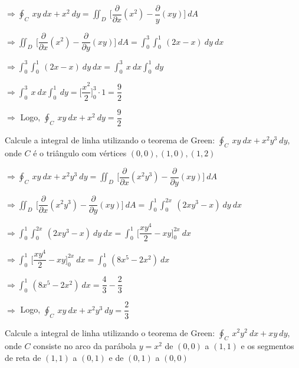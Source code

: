 \documentclass[11pt,a4paper]{article}
\begin{document}
\begin{enumerate}
{		$\Rightarrow \displaystyle\oint_C\ xy\ dx + x^2\ dy = \displaystyle\iint_D\ \Bigg[\dfrac{\partial}{\partial x}(x^2) - \dfrac{\partial}{y}(xy)\Bigg]\ dA$
		
		$\Rightarrow \displaystyle\iint_D\ \Bigg[\dfrac{\partial}{\partial x}(x^2) - \dfrac{\partial}{\partial y}(xy)\Bigg]\ dA = \displaystyle\int_{0}^{3}\displaystyle\int_{0}^{1}\ (2x - x)\ dy \ dx$
		
		$\Rightarrow \displaystyle\int_{0}^{3}\displaystyle\int_{0}^{1}\ (2x - x)\ dy \ dx = \displaystyle\int_{0}^{3}\ x\ dx \displaystyle\int_{0}^{1}\ dy$
		
		$\Rightarrow \displaystyle\int_{0}^{3}\ x\ dx \displaystyle\int_{0}^{1}\ dy = \Bigg[\dfrac{x^2}{2}\Bigg]_0^3 \cdot 1 = \dfrac{9}{2}$
		
		$\Rightarrow$ Logo, $\displaystyle\oint_C\ xy\ dx + x^2\ dy = \dfrac{9}{2}$
		
		
		\item Calcule a integral de linha utilizando o teorema de Green: $\displaystyle\oint_C\ xy\ dx + x^2y^3\ dy$, onde $C$ é o triângulo com vértices $(0,0),(1,0),(1,2)$
		
		$\Rightarrow \displaystyle\oint_C\ xy\ dx + x^2y^3\ dy = \displaystyle\iint_D\ \Bigg[\dfrac{\partial}{\partial x}(x^2y^3) - \dfrac{\partial}{\partial y}(xy)\Bigg]\ dA $
		
		$\Rightarrow \displaystyle\iint_D\ \Bigg[\dfrac{\partial}{\partial x}(x^2y^3) - \dfrac{\partial}{\partial y}(xy)\Bigg]\ dA = \displaystyle\int_{0}^{1}\displaystyle\int_{0}^{2x}\ (2xy^3 - x)\ dy\ dx$
		
		$\Rightarrow \displaystyle\int_{0}^{1}\displaystyle\int_{0}^{2x}\ (2xy^3 - x)\ dy\ dx = \displaystyle\int_{0}^{1}\ \Bigg[\dfrac{xy^4}{2} - xy\Bigg]_0^{2x}\ dx$
		
		$\Rightarrow \displaystyle\int_{0}^{1}\ \Bigg[\dfrac{xy^4}{2} - xy\Bigg]_0^{2x}\ dx = \displaystyle\int_{0}^{1}\ (8x^5 - 2x^2)\ dx $
		
		$\Rightarrow \displaystyle\int_{0}^{1}\ (8x^5 - 2x^2)\ dx  = \dfrac{4}{3} - \dfrac{2}{3}$
		
		$\Rightarrow$ Logo, $\displaystyle\oint_C\ xy\ dx + x^2y^3\ dy = \dfrac{2}{3}$
		\item Calcule a integral de linha utilizando o teorema de Green: $\displaystyle\oint_C\ x^2y^2\ dx + xy\ dy$, onde $C$ consiste no arco da parábola $y = x^2$ de $(0,0)$ a $(1,1)$ e os segmentos de reta de $(1,1)$ a $(0,1)$ e de $(0,1)$ a $(0,0)$
		
}
\end{enumerate}
\end{document}
